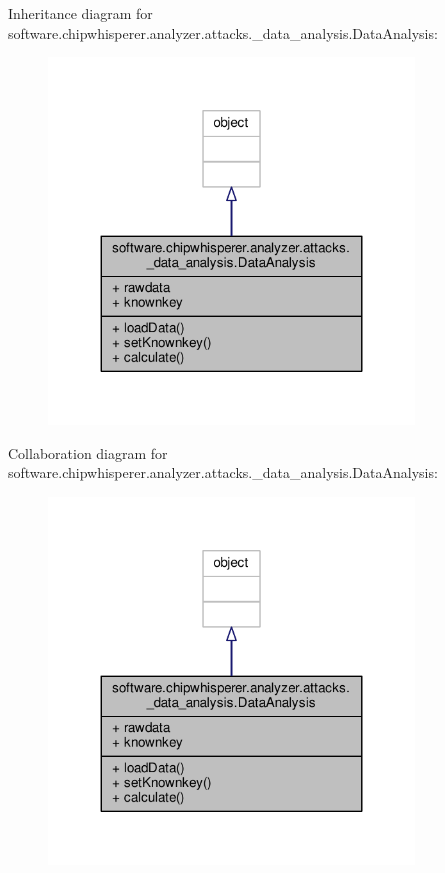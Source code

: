 Inheritance diagram for software.\+chipwhisperer.\+analyzer.\+attacks.\+\_\+data\+\_\+analysis.\+Data\+Analysis\+:\nopagebreak
\begin{figure}[H]
\begin{center}
\leavevmode
\includegraphics[width=275pt]{d2/dd3/classsoftware_1_1chipwhisperer_1_1analyzer_1_1attacks_1_1__data__analysis_1_1DataAnalysis__inherit__graph}
\end{center}
\end{figure}


Collaboration diagram for software.\+chipwhisperer.\+analyzer.\+attacks.\+\_\+data\+\_\+analysis.\+Data\+Analysis\+:\nopagebreak
\begin{figure}[H]
\begin{center}
\leavevmode
\includegraphics[width=275pt]{dc/d37/classsoftware_1_1chipwhisperer_1_1analyzer_1_1attacks_1_1__data__analysis_1_1DataAnalysis__coll__graph}
\end{center}
\end{figure}


